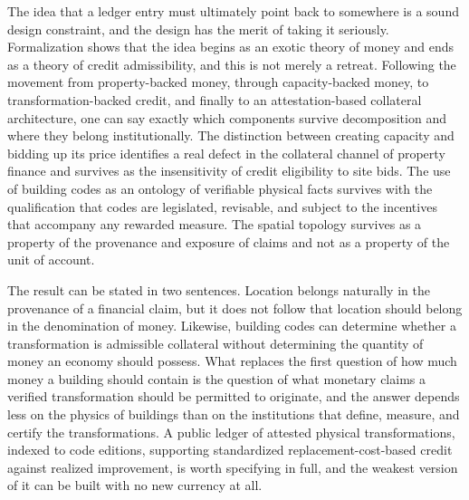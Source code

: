 \documentclass[11pt]{article}
\theoremstyle{definition}
\begin{document}
The idea that a ledger entry must ultimately point back to somewhere is a sound design constraint, and the design has the merit of taking it seriously. Formalization shows that the idea begins as an exotic theory of money and ends as a theory of credit admissibility, and this is not merely a retreat. Following the movement from property-backed money, through capacity-backed money, to transformation-backed credit, and finally to an attestation-based collateral architecture, one can say exactly which components survive decomposition and where they belong institutionally. The distinction between creating capacity and bidding up its price identifies a real defect in the collateral channel of property finance and survives as the insensitivity of credit eligibility to site bids. The use of building codes as an ontology of verifiable physical facts survives with the qualification that codes are legislated, revisable, and subject to the incentives that accompany any rewarded measure. The spatial topology survives as a property of the provenance and exposure of claims and not as a property of the unit of account.

The result can be stated in two sentences. Location belongs naturally in the provenance of a financial claim, but it does not follow that location should belong in the denomination of money. Likewise, building codes can determine whether a transformation is admissible collateral without determining the quantity of money an economy should possess. What replaces the first question of how much money a building should contain is the question of what monetary claims a verified transformation should be permitted to originate, and the answer depends less on the physics of buildings than on the institutions that define, measure, and certify the transformations. A public ledger of attested physical transformations, indexed to code editions, supporting standardized replacement-cost-based credit against realized improvement, is worth specifying in full, and the weakest version of it can be built with no new currency at all.
\end{document}
